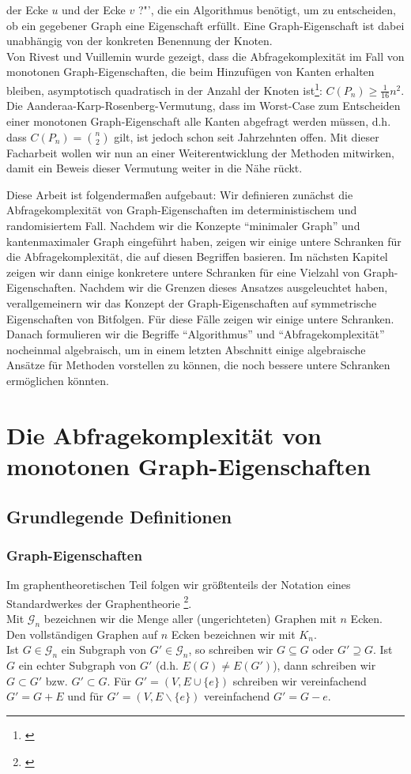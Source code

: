 \documentclass[a4paper]{scrreprt}
\theoremstyle{definition}
\begin{document}
der Ecke $u$ und der Ecke $v$ ?"', die ein Algorithmus
benötigt, um zu entscheiden, ob ein gegebener Graph
eine Eigenschaft erfüllt. Eine Graph-Eigenschaft ist
dabei unabhängig von der konkreten Benennung der Knoten. \\
Von Rivest und Vuillemin wurde gezeigt,
dass die Abfragekomplexität
im Fall von monotonen Graph-Eigenschaften, die beim 
Hinzufügen von Kanten erhalten bleiben, asymptotisch
quadratisch in der Anzahl der Knoten
ist\footnote{\cite{Rivest}}: $C(P_n) \geq \frac{1}{16}n^2$.
Die Aanderaa-Karp-Rosenberg-Vermutung, dass im Worst-Case
zum Entscheiden einer monotonen Graph-Eigenschaft
alle Kanten abgefragt werden müssen, d.h. dass
$C(P_n)=\binom{n}{2}$ gilt, ist jedoch schon
seit Jahrzehnten offen. Mit dieser Facharbeit
wollen wir nun an einer Weiterentwicklung der
Methoden mitwirken, damit ein Beweis dieser Vermutung
weiter in die Nähe rückt.

Diese Arbeit ist folgendermaßen aufgebaut:
Wir definieren zunächst die Abfragekomplexität
von Graph-Eigenschaften im deterministischem und
randomisiertem Fall. Nachdem wir die Konzepte
"`minimaler Graph"' und kantenmaximaler Graph
eingeführt haben, zeigen wir einige untere Schranken
für die Abfragekomplexität, die auf diesen Begriffen
basieren. Im nächsten Kapitel zeigen wir dann einige
konkretere untere Schranken für eine Vielzahl von
Graph-Eigenschaften. Nachdem wir die Grenzen 
dieses Ansatzes ausgeleuchtet haben, verallgemeinern
wir das Konzept der Graph-Eigenschaften auf 
symmetrische Eigenschaften von Bitfolgen. Für
diese Fälle zeigen wir einige untere Schranken.
Danach formulieren wir die Begriffe "`Algorithmus"'
und "`Abfragekomplexität"' nocheinmal algebraisch, um
in einem letzten Abschnitt
einige algebraische Ansätze für Methoden vorstellen zu
können, die noch bessere untere Schranken ermöglichen könnten.

\chapter{Die Abfragekomplexität von monotonen Graph-Eigenschaften}
\section{Grundlegende Definitionen}
\subsection{Graph-Eigenschaften}
Im graphentheoretischen Teil folgen wir größtenteils
der Notation eines Standardwerkes der Graphentheorie \footnote{\cite{diestel}}. \\
Mit $\mathcal{G}_n$ bezeichnen wir die Menge aller
(ungerichteten) Graphen mit $n$ Ecken. \\
Den vollständigen Graphen auf $n$ Ecken bezeichnen wir
mit $K_n$. \\
Ist $G \in \mathcal{G}_n$ ein Subgraph von $G' \in \mathcal{G}_n$,
so schreiben wir $G \subseteq G$ oder $G' \supseteq G$. Ist $G$ ein
echter Subgraph von $G'$ (d.h. $E(G) \neq E(G')$), dann schreiben
wir $G \subset G'$ bzw. $G' \subset G$.
Für $G' = (V, E \cup \{e\})$ schreiben wir vereinfachend
$G' = G + E$ und für $G' = (V, E \backslash \{e\})$ vereinfachend
$G' = G - e$.
\end{document}
